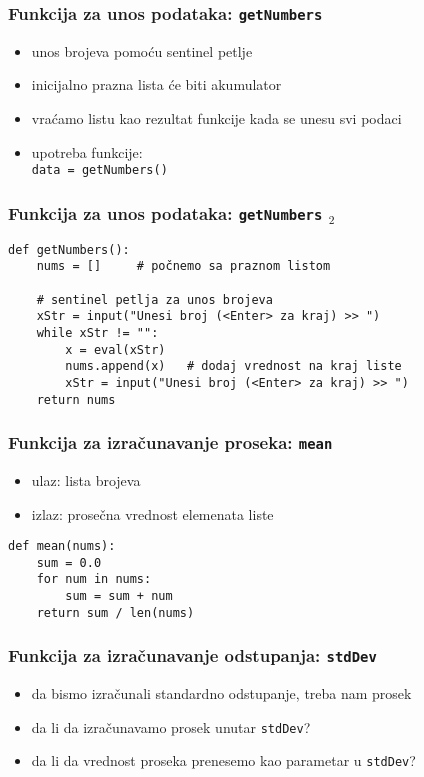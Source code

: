 \documentclass[utf8,compress]{beamer}
\begin{document}
\begin{frame}[fragile]
  \frametitle{Funkcija za unos podataka: \texttt{getNumbers}}
  \begin{itemize}
    \item unos brojeva pomoću sentinel petlje
    \item inicijalno prazna lista će biti akumulator
    \item vraćamo listu kao rezultat funkcije kada se unesu svi podaci
    \item upotreba funkcije: \\
    \texttt{data = getNumbers()}
  \end{itemize}
\end{frame}

\begin{frame}[fragile]
  \frametitle{Funkcija za unos podataka: \texttt{getNumbers} $_2$}
\begin{verbatim}
def getNumbers():
    nums = []     # počnemo sa praznom listom

    # sentinel petlja za unos brojeva
    xStr = input("Unesi broj (<Enter> za kraj) >> ")
    while xStr != "":
        x = eval(xStr)
        nums.append(x)   # dodaj vrednost na kraj liste
        xStr = input("Unesi broj (<Enter> za kraj) >> ")
    return nums
\end{verbatim}
\end{frame}

\begin{frame}[fragile]
  \frametitle{Funkcija za izračunavanje proseka: \texttt{mean}}
  \begin{itemize}
    \item ulaz: lista brojeva
    \item izlaz: prosečna vrednost elemenata liste
  \end{itemize}
\begin{verbatim}
def mean(nums):
    sum = 0.0
    for num in nums:
        sum = sum + num
    return sum / len(nums)
\end{verbatim}
\end{frame}

\begin{frame}[fragile]
  \frametitle{Funkcija za izračunavanje odstupanja: \texttt{stdDev}}
  \begin{itemize}
    \item da bismo izračunali standardno odstupanje, treba nam prosek
    \item da li da izračunavamo prosek unutar \texttt{stdDev}?
    \item da li da vrednost proseka prenesemo kao parametar u \texttt{stdDev}?
  \end{itemize}
\end{frame}
\end{document}
